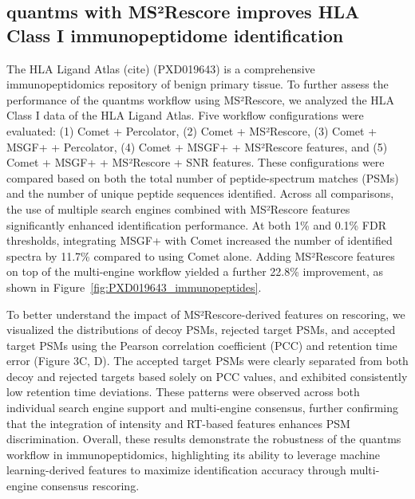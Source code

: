 \documentclass[12pt]{article}
\begin{document}
\subsection{quantms with MS²Rescore improves HLA Class I immunopeptidome identification}
The HLA Ligand Atlas (cite) (PXD019643) is a comprehensive immunopeptidomics repository of benign primary tissue. To further assess the performance of the quantms workflow using MS²Rescore, we analyzed the HLA Class I data of the HLA Ligand Atlas. %
Five workflow configurations were evaluated: (1) Comet + Percolator, (2) Comet + MS²Rescore, (3) Comet + MSGF+ + Percolator, (4) Comet + MSGF+ + MS²Rescore features, and (5) Comet + MSGF+ + MS²Rescore + SNR features. %
These configurations were compared based on both the total number of peptide-spectrum matches (PSMs) and the number of unique peptide sequences identified. Across all comparisons, the use of multiple search engines combined with MS²Rescore features significantly enhanced identification performance. At both 1\% and 0.1\% FDR thresholds, %
integrating MSGF+ with Comet increased the number of identified spectra by 11.7\% compared to using Comet alone. Adding MS²Rescore features on top of the multi-engine workflow yielded a further 22.8\% improvement, as shown in Figure~\ref{fig:PXD019643_immunopeptides}.

To better understand the impact of MS²Rescore-derived features on rescoring, we visualized the distributions of decoy PSMs, rejected target PSMs, and accepted target PSMs using the Pearson correlation coefficient (PCC) and retention time error (Figure 3C, D). The accepted target PSMs were clearly separated from both decoy and rejected targets based solely on PCC values, and exhibited consistently low retention time deviations. These patterns were observed across both individual search engine support and multi-engine consensus, further confirming that the integration of intensity and RT-based features enhances PSM discrimination. Overall, these results demonstrate the robustness of the quantms workflow in immunopeptidomics, highlighting its ability to leverage machine learning-derived features to maximize identification accuracy through multi-engine consensus rescoring.
\end{document}
